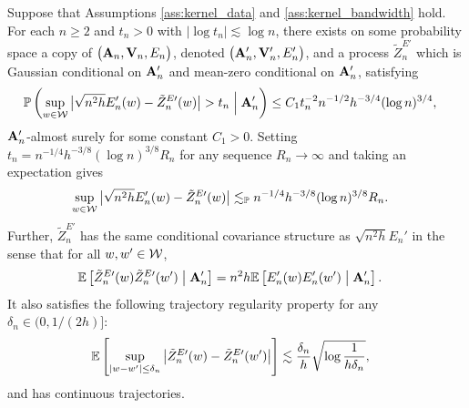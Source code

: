 \begin{lemma}
  \label{lem:app_conditional_strong_approx_En}

  Suppose that Assumptions
  \ref{ass:kernel_data} and \ref{ass:kernel_bandwidth} hold.
  For each $n \geq 2$
  and $t_n > 0$ with $\left|\log t_n\right| \lesssim \log n$,
  there exists on some probability space
  a copy of
  $\big(\mathbf{A}_n, \mathbf{V}_n, E_n\big)$,
  denoted
  $\big(\mathbf{A}_n', \mathbf{V}_n', E_n'\big)$,
  and a process
  $\tilde Z^{E\prime}_n$
  which is Gaussian conditional on $\mathbf{A}_n'$
  and mean-zero conditional on $\mathbf{A}_n'$,
  satisfying
  \begin{align*}
    \mathbb{P}\left(
      \sup_{w \in \mathcal{W}}
      \big|
      \sqrt{n^2h} E_n'(w) - \tilde Z_n^{E\prime}(w)
      \big|
      > t_n
      \Bigm\vert \mathbf{A}_n'
    \right)
    &\leq
    C_1
    t_n^{-2}
    n^{-1/2}
    h^{-3/4}
    (\log n)^{3/4},
  \end{align*}
  $\mathbf{A}_n'$-almost surely
  for some constant $C_1 > 0$.
  Setting $t_n = n^{-1/4} h^{-3/8} (\log n)^{3/8} R_n$
  for any sequence $R_n \to \infty$
  and taking an expectation gives
  \begin{align*}
    \sup_{w \in \mathcal{W}}
    \big|
    \sqrt{n^2h} E_n'(w) - \tilde Z_n^{E\prime}(w)
    \big|
    &\lesssim_{\mathbb{P}}
    n^{-1/4}
    h^{-3/8} (\log n)^{3/8} R_n.
  \end{align*}
  Further,
  $\tilde Z_n^{E\prime}$ has the same
  conditional covariance structure as
  $\sqrt{n^2h} E_n'$ in the sense that for all $w, w' \in \mathcal{W}$,
  \begin{align*}
    \mathbb{E}\left[
      \tilde Z_n^{E\prime}(w)
      \tilde Z_n^{E\prime}(w')
      \bigm\vert \mathbf{A}_n'
    \right]
    &=
    n^2h
    \mathbb{E}\left[
      E_n'(w)
      E_n'(w')
      \bigm\vert \mathbf{A}_n'
    \right].
  \end{align*}
  It also satisfies the following
  trajectory regularity property
  for any $\delta_n \in (0, 1/(2h)]$:
  \begin{align*}
    \mathbb{E}\left[
      \sup_{|w-w'| \leq \delta_n}
      \big|
      \tilde Z_n^{E\prime}(w)
      - \tilde Z_n^{E\prime}(w')
      \big|
    \right]
    &\lesssim
    \frac{\delta_n}{h}
    \sqrt{\log \frac{1}{h\delta_n}},
  \end{align*}
  and has continuous trajectories.

\end{lemma}

